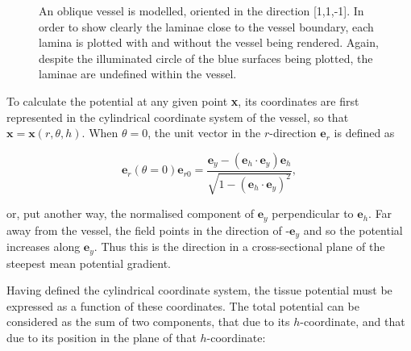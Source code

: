 \begin{figure}[htbp]
     \qquad
    \caption{An oblique vessel is modelled, oriented in the direction [1,1,-1]. In order to show clearly the laminae close to the vessel boundary, each lamina is plotted with and without the vessel being rendered. Again, despite the illuminated circle of the blue surfaces being plotted, the laminae are undefined within the vessel.}
    \label{fig:oblique}
  \end{figure}
  
  To calculate the potential at any given point \textbf{x}, its coordinates are first represented in the cylindrical coordinate system of the vessel, so that $\mathbf{x} = \mathbf{x}(r,\theta,h)$. When $\theta = 0$, the unit vector in the $r$-direction $\mathbf{e}_r$ is defined as
  
  \begin{equation}
    \mathbf{e}_r(\theta = 0) \mathbf{e}_{r0} = \frac{\mathbf{e}_y - (\mathbf{e}_h \cdot \mathbf{e}_y) \mathbf{e}_h}{\sqrt{1 - \left(\mathbf{e}_h \cdot \mathbf{e}_y\right)^2}},
  \end{equation}
  
  or, put another way, the normalised component of $\mathbf{e}_y$ perpendicular to $\mathbf{e}_h$. Far away from the vessel, the field points in the direction of -$\mathbf{e}_y$ and so the potential increases along $\mathbf{e}_y$. Thus this is the direction in a cross-sectional plane of the steepest mean potential gradient.
  
  Having defined the cylindrical coordinate system, the tissue potential must be expressed as a function of these coordinates. The total potential can be considered as the sum of two components, that due to its $h$-coordinate, and that due to its position in the plane of that $h$-coordinate:
  
